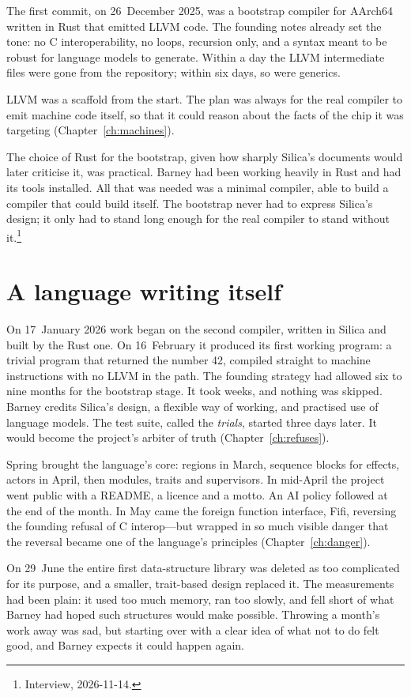 The first commit, on 26~December 2025, was a bootstrap compiler for AArch64
written in Rust that emitted LLVM code. The founding notes already set the tone:
no C interoperability, no loops, recursion only, and a syntax meant to be
robust for language models to generate. Within a day the LLVM intermediate
files were gone from the repository; within six days, so were generics.

LLVM was a scaffold from the start. The plan was always for the real compiler
to emit machine code itself, so that it could reason about the facts of the
chip it was targeting (Chapter~\ref{ch:machines}).

The choice of Rust for the bootstrap, given how sharply Silica's documents
would later criticise it, was practical. Barney had been working heavily in Rust
and had its tools installed. All that was needed was a minimal compiler, able to
build a compiler that could build itself. The bootstrap never had to express
Silica's design; it only had to stand long enough for the real compiler to stand
without it.\footnote{Interview, 2026-11-14.}

\section{A language writing itself}

On 17~January 2026 work began on the second compiler, written in Silica and
built by the Rust one. On 16~February it produced its first working program:
a trivial program that returned the number 42, compiled straight to machine
instructions with no LLVM in the path. The founding strategy had allowed six to
nine months for the bootstrap stage. It took weeks, and nothing was skipped.
Barney credits Silica's design, a flexible way of working, and practised use of
language models. The test suite, called the \emph{trials}, started three days later. It
would become the project's arbiter of truth (Chapter~\ref{ch:refuses}).

Spring brought the language's core: regions in March, sequence blocks for
effects, actors in April, then modules, traits and supervisors. In mid-April the
project went public with a README, a licence and a motto. An AI policy followed
at the end of the month. In May came the foreign function interface, Fifi,
reversing the founding refusal of C interop---but wrapped in so much visible
danger that the reversal became one of the language's principles
(Chapter~\ref{ch:danger}).

On 29~June the entire first data-structure library was deleted as too
complicated for its purpose, and a smaller, trait-based design replaced it. The
measurements had been plain: it used too much memory, ran too slowly, and fell
short of what Barney had hoped such structures would make possible. Throwing a
month's work away was sad, but starting over with a clear idea of what not to do
felt good, and Barney expects it could happen again.

